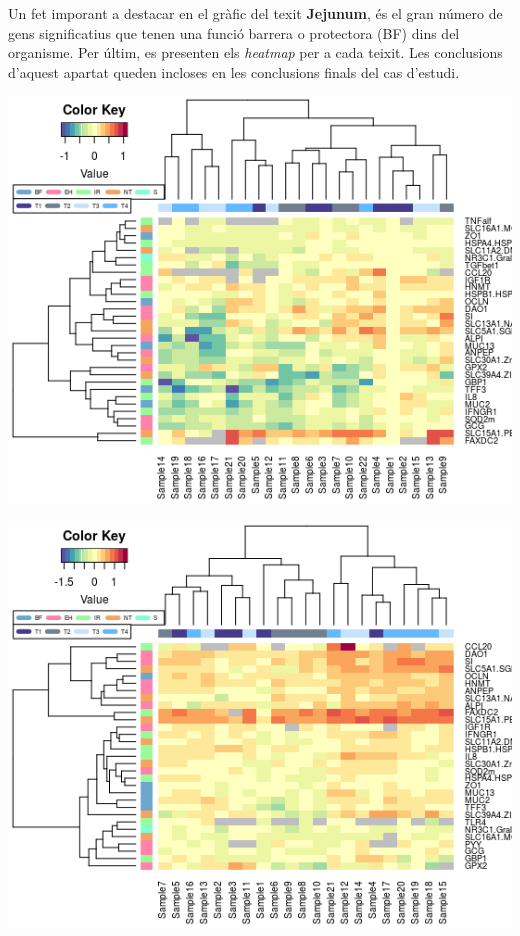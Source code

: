 \documentclass[english]{article}
\begin{document}
Un fet imporant a destacar en el gràfic del texit \textbf{Jejunum}, és el gran número de gens significatius que tenen una funció barrera o protectora (BF) dins del organisme.
\clearpage
Per últim, es presenten els \textit{heatmap} per a cada teixit. Les conclusions d'aquest apartat queden incloses en les conclusions finals del cas d'estudi.
\begin{center}
\includegraphics[scale=0.9]{heatmapi.png}
\end{center}
\begin{center}
\includegraphics[scale=0.9]{heatmapj.png}
\end{center}
\clearpage
\twocolumn
\end{document}
